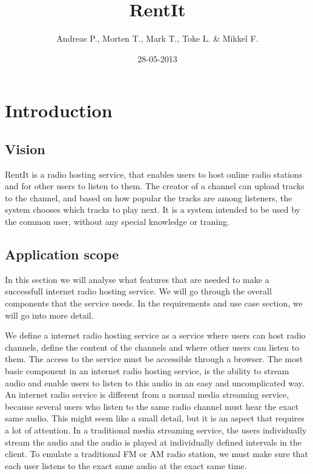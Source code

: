 \documentclass[a4paper,11pt,report]{article}
\begin{document}
\title{RentIt}
\author{Andreas P., Morten T., Mark T., Toke L. \& Mikkel F.}
\date{28-05-2013}
\maketitle

\section{Introduction}
\subsection{Vision}
RentIt is a radio hosting service, that enables users to host online radio stations and for other users to listen to them. The creator of a channel can upload tracks to the channel, and based on how popular the tracks are among listeners, the system chooses which tracks to play next.
It is a system intended to be used by the common user, without any special knowledge or traning.

\subsection{Application scope}
In this section we will analyse what features that are needed to make a successfull internet radio hosting service. We will go through the overall components that the service needs. In the requirements and use case section, we will go into more detail.

We define a internet radio hosting service as a service where users can host radio channels, define the content of the channels and where other users can listen to them. The access to the service must be accessible through a browser. The most basic component in an internet radio hosting service, is the ability to stream audio and enable users to listen to this audio in an easy and uncomplicated way. An internet radio service is different from a normal media streaming service, because several users who listen to the same radio channel must hear the exact same audio. This might seem like a small detail, but it is an aspect that requires a lot of attention. In a traditional media streaming service, the users individually stream the audio and the audio is played at individually defined intervals in the client. To emulate a traditional FM or AM radio station, we must make sure that each user listens to the exact same audio at the exact same time. 
\end{document}
